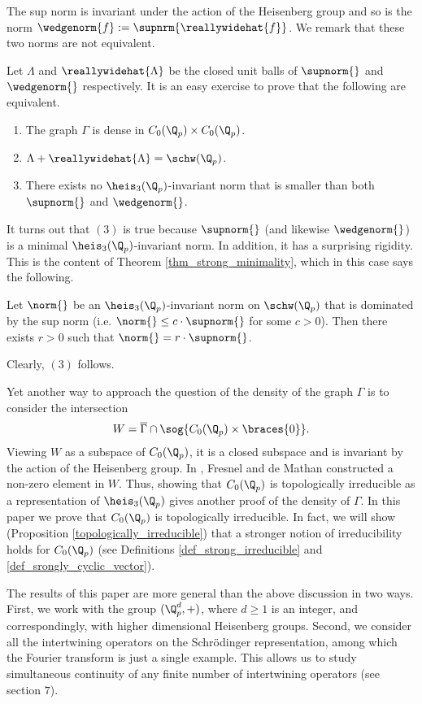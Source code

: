 The sup norm is invariant under the action of the Heisenberg group and so is the norm $\wedgenorm{f}:=\supnrm{\reallywidehat{f}}$.
We remark that these two norms are not equivalent.

Let $\Lambda$ and $\reallywidehat{\Lambda}$ be the closed unit balls of $\supnorm{}$ and $\wedgenorm{}$ respectively.
It is an easy exercise to prove that the following are equivalent.
    \begin{enumerate}
    \item The graph $\Gamma$ is dense in $C_0(\Q_p)\times C_0(\Q_p)$.
    \item $\Lambda+\reallywidehat{\Lambda}=\schw(\Q_p)$.
    \item There exists no $\heis_3(\Q_p)$-invariant norm that is smaller than both $\supnorm{}$ and $\wedgenorm{}$.
    \end{enumerate}

It turns out that $(3)$ is true because $\supnorm{}$ (and likewise $\wedgenorm{}$) is a minimal $\heis_3(\Q_p)$-invariant norm.
In addition, it has a surprising rigidity.
This is the content of Theorem \ref{thm_strong_minimality}, which in this case says the following.

\begin{theorem*}
Let $\norm{}$ be an $\heis_3(\Q_p)$-invariant norm on $\schw(\Q_p)$ that is dominated by the sup norm (i.e. $\norm{}\leq c\cdot \supnorm{}$ for some $c>0$).
Then there exists $r>0$ such that $\norm{}=r\cdot \supnorm{}$.
\end{theorem*} 
Clearly, $(3)$  follows.


Yet another way to approach the question of the density of the graph $\Gamma$ is to consider the intersection
\[W=\overline{\Gamma}\cap\sog{C_0(\Q_p)\times\braces{0}}.\]
Viewing $W$ as a subspace of $C_0(\Q_p)$, it is a closed subspace and is invariant by the action of the Heisenberg group.
In \cite{demathan}, Fresnel and de Mathan constructed a non-zero element in $W$.
Thus, showing that $C_0(\Q_p)$ is topologically irreducible as a representation of $\heis_3(\Q_p)$ gives another proof of the density of $\Gamma$.
In this paper we prove that $C_0(\Q_p)$ is topologically irreducible.
In fact, we will show (Proposition \ref{topologically_irreducible}) that a stronger notion of irreducibility  holds for $C_0(\Q_p)$ (see Definitions \ref{def_strong_irreducible} and \ref{def_srongly_cyclic_vector}).

The results of this paper are more general than the above discussion in two ways.
First, we work with the group $(\Q_p^d,+)$, where $d\geq 1$ is an integer, and correspondingly, with higher dimensional Heisenberg groups.
Second, we consider all the intertwining operators on the Schrödinger representation, among which the Fourier transform is just a single example.
This allows us to study simultaneous continuity of any finite number of intertwining operators (see section $7$).

